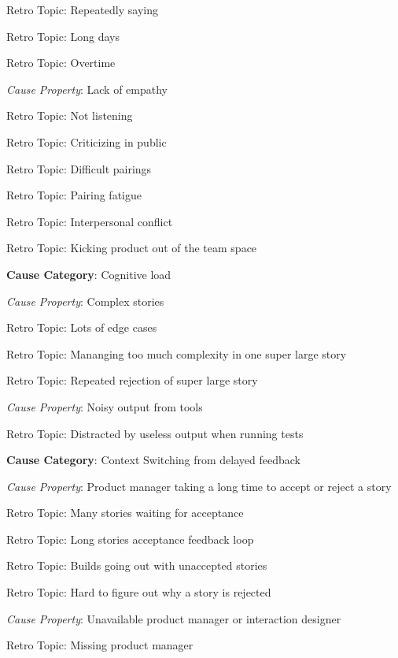 \quad \quad \quad Retro Topic: Repeatedly saying 

\quad \quad \quad Retro Topic: Long days

\quad \quad \quad Retro Topic: Overtime

\quad \quad \textit{Cause Property}: Lack of empathy

\quad \quad \quad Retro Topic: Not listening

\quad \quad \quad Retro Topic: Criticizing in public

\quad \quad \quad Retro Topic: Difficult pairings

\quad \quad \quad Retro Topic: Pairing fatigue

\quad \quad \quad Retro Topic: Interpersonal conflict

\quad \quad \quad Retro Topic: Kicking product out of the team space

\quad \textbf{Cause Category}: Cognitive load

\quad \quad \textit{Cause Property}: Complex stories

\quad \quad \quad Retro Topic: Lots of edge cases

\quad \quad \quad Retro Topic: Mananging too much complexity in one super large story

\quad \quad \quad Retro Topic: Repeated rejection of super large story

\quad \quad \textit{Cause Property}: Noisy output from tools

\quad \quad \quad Retro Topic: Distracted by useless output when running tests

\quad \textbf{Cause Category}: Context Switching from delayed feedback

\quad \quad \textit{Cause Property}: Product manager taking a long time to accept or reject a story

\quad \quad \quad Retro Topic: Many stories waiting for acceptance

\quad \quad \quad Retro Topic: Long stories acceptance feedback loop

\quad \quad \quad Retro Topic: Builds going out with unaccepted stories

\quad \quad \quad Retro Topic: Hard to figure out why a story is rejected

\quad \quad \textit{Cause Property}: Unavailable product manager or interaction designer

\quad \quad \quad Retro Topic: Missing product manager

